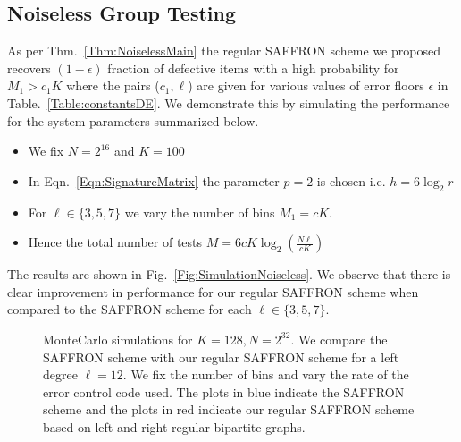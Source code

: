 \documentclass[conference,,twocolumn]{IEEEtran}
\begin{document}
\subsection*{Noiseless Group Testing}
As per Thm.~\ref{Thm:NoiselessMain} the regular SAFFRON scheme we proposed recovers $(1-\epsilon)$ fraction of defective items with a high probability for $M_1>c_1 K$ where the pairs ($c_1,\ell$) are given for various values of error floors $\epsilon$ in Table.~\ref{Table:constantsDE}. We demonstrate this by simulating the performance for the system parameters summarized below.
\begin{itemize}
\item We fix $N=2^{16}$ and $K=100$
\item In Eqn.~\ref{Eqn:SignatureMatrix} the parameter $p=2$ is chosen i.e. $h=6\log_2 r$
\item For $\ell\in\{3,5,7\}$ we vary the number of bins $M_1=cK$. 
\item Hence the total number of tests $M=6cK\log_2 \left(\frac{N\ell}{cK}\right)$
\end{itemize} 
The results are shown in Fig.~\ref{Fig:SimulationNoiseless}. We observe that there is clear improvement in performance for our regular SAFFRON scheme when compared to the SAFFRON scheme for each $\ell\in\{3,5,7\}$.

\begin{figure}[t!]
\centering

\caption{MonteCarlo simulations for $K=128, N=2^{32}$. We compare the SAFFRON scheme with our regular SAFFRON scheme for a left degree $\ell=12$. We fix the number of bins and vary the rate of the error control code used. The plots in blue indicate the SAFFRON scheme\cite{lee2015saffron} and the plots in red indicate our regular SAFFRON scheme based on left-and-right-regular bipartite graphs.}
\label{Fig:SimulationNoisy}
\end{figure}
\end{document}
